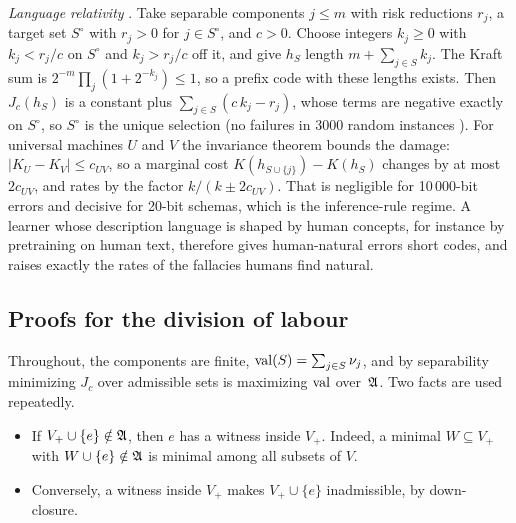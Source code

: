 \emph{Language relativity} . Take separable components $j\le m$ with risk reductions $r_j$, a target set $S^\circ$ with $r_j>0$ for $j\in S^\circ$, and $c>0$. Choose integers $k_j\ge0$ with $k_j<r_j/c$ on $S^\circ$ and $k_j>r_j/c$ off it, and give $h_S$ length $m+\sum_{j\in S}k_j$. The Kraft sum is $2^{-m}\prod_j(1+2^{-k_j})\le1$, so a prefix code with these lengths exists. Then $J_c(h_S)$ is a constant plus $\sum_{j\in S}(c\,k_j-r_j)$, whose terms are negative exactly on $S^\circ$, so $S^\circ$ is the unique selection (no failures in 3000 random instances ). For universal machines $U$ and $V$ the invariance theorem bounds the damage: $|K_U-K_V|\le c_{UV}$, so a marginal cost $K(h_{S\cup\{j\}})-K(h_S)$ changes by at most $2c_{UV}$, and rates by the factor $k/(k\pm2c_{UV})$. That is negligible for 10\,000-bit errors and decisive for 20-bit schemas, which is the inference-rule regime. A learner whose description language is shaped by human concepts, for instance by pretraining on human text, therefore gives human-natural errors short codes, and raises exactly the rates of the fallacies humans find natural.

\subsection{Proofs for the division of labour}\label{app:simplicity:division}

Throughout, the components are finite, $\mathrm{val}(S)=\sum_{j\in S}\nu_j$, and by separability minimizing $J_c$ over admissible sets is maximizing $\mathrm{val}$ over~$\mathfrak A$. Two facts are used repeatedly.
\begin{itemize}
\item If $V_+\cup\{e\}\notin\mathfrak A$, then $e$ has a witness inside $V_+$. Indeed, a minimal $W\subseteq V_+$ with $W\cup\{e\}\notin\mathfrak A$ is minimal among all subsets of $V$.
\item Conversely, a witness inside $V_+$ makes $V_+\cup\{e\}$ inadmissible, by down-closure.
\end{itemize}

